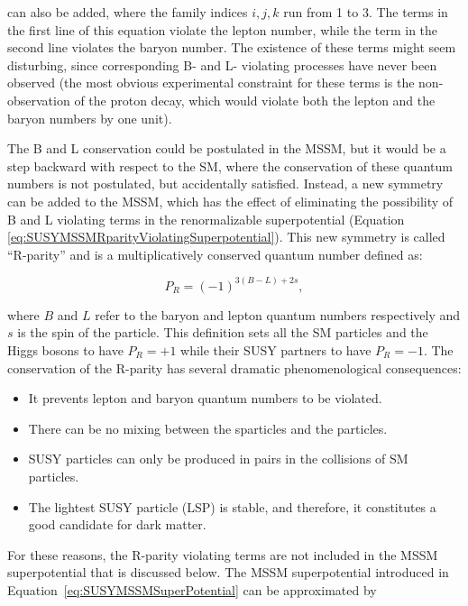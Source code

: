 \noindent can also be added, where the family indices $i, j, k$ run from 1 to 3.
The terms in the first line of this equation violate the lepton number, while the term in the second line violates the baryon number.
The existence of these terms might seem disturbing, since corresponding B- and L- violating processes have never been observed (the most obvious experimental constraint for these terms is the non-observation of the proton decay, which would violate both the lepton and the baryon numbers by one unit).

The B and L conservation could be postulated in the MSSM, but it would be a step backward with respect to the SM, where the conservation of these quantum numbers is not postulated, but accidentally satisfied.
Instead, a new symmetry can be added to the MSSM, which has the effect of eliminating the possibility of B and L violating terms in the renormalizable superpotential (Equation \ref{eq:SUSYMSSMRparityViolatingSuperpotential}).
This new symmetry is called ``R-parity'' and is a multiplicatively conserved quantum number defined as:

\begin{equation}
P_R = (-1)^{3(B-L)+2s},
\label{eq:RparityDefinition}
\end{equation}

\noindent where $B$ and $L$ refer to the baryon and lepton quantum numbers respectively and $s$ is the spin of the particle.
This definition sets all the SM particles and the Higgs bosons to have $P_R = +1$ while their SUSY partners to have $P_R = -1$.
The conservation of the R-parity has several dramatic phenomenological consequences:

\begin{itemize}
\item It prevents lepton and baryon quantum numbers to be violated.
\item There can be no mixing between the sparticles and the particles.
\item SUSY particles can only be produced in pairs in the collisions of SM particles.
\item The lightest SUSY particle (LSP) is stable, and therefore, it constitutes a good candidate for dark matter.
\end{itemize}

For these reasons, the R-parity violating terms are not included in the MSSM superpotential that is discussed below.
The MSSM superpotential introduced in Equation~\ref{eq:SUSYMSSMSuperPotential} can be approximated by 

